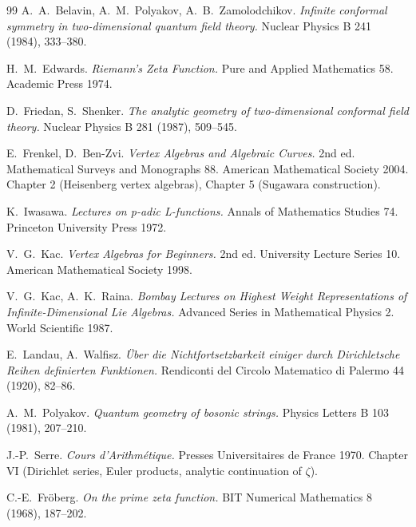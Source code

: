 \begin{thebibliography}{99}
\label{v4-arith:w9-r3:bibliography}
A.~A.~Belavin, A.~M.~Polyakov, A.~B.~Zamolodchikov.
\emph{Infinite conformal symmetry in two-dimensional quantum field
theory.} Nuclear Physics B 241 (1984), 333--380.

H.~M.~Edwards.
\emph{Riemann's Zeta Function.}
Pure and Applied Mathematics 58. Academic Press 1974.

D.~Friedan, S.~Shenker.
\emph{The analytic geometry of two-dimensional conformal field
theory.} Nuclear Physics B 281 (1987), 509--545.

E.~Frenkel, D.~Ben-Zvi.
\emph{Vertex Algebras and Algebraic Curves.} 2nd ed.
Mathematical Surveys and Monographs 88. American Mathematical
Society 2004. Chapter 2 (Heisenberg vertex algebras), Chapter 5
(Sugawara construction).

K.~Iwasawa.
\emph{Lectures on p-adic L-functions.}
Annals of Mathematics Studies 74. Princeton University Press 1972.

V.~G.~Kac.
\emph{Vertex Algebras for Beginners.} 2nd ed.
University Lecture Series 10. American Mathematical Society 1998.

V.~G.~Kac, A.~K.~Raina.
\emph{Bombay Lectures on Highest Weight Representations of
Infinite-Dimensional Lie Algebras.}
Advanced Series in Mathematical Physics 2. World Scientific 1987.

E.~Landau, A.~Walfisz.
\emph{\"Uber die Nichtfortsetzbarkeit einiger durch Dirichletsche
Reihen definierten Funktionen.}
Rendiconti del Circolo Matematico di Palermo 44 (1920), 82--86.

A.~M.~Polyakov.
\emph{Quantum geometry of bosonic strings.}
Physics Letters B 103 (1981), 207--210.

J.-P.~Serre.
\emph{Cours d'Arithm\'etique.}
Presses Universitaires de France 1970. Chapter VI (Dirichlet
series, Euler products, analytic continuation of \(\zeta\)).

C.-E.~Fr\"oberg.
\emph{On the prime zeta function.}
BIT Numerical Mathematics 8 (1968), 187--202.
\end{thebibliography}
